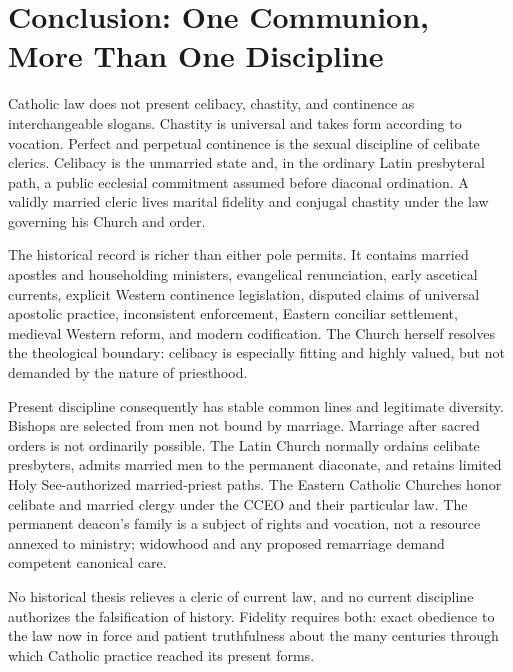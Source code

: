 \section{Conclusion: One Communion, More Than One Discipline}

Catholic law does not present celibacy, chastity, and continence as interchangeable slogans. Chastity is universal and takes form according to vocation. Perfect and perpetual continence is the sexual discipline of celibate clerics. Celibacy is the unmarried state and, in the ordinary Latin presbyteral path, a public ecclesial commitment assumed before diaconal ordination. A validly married cleric lives marital fidelity and conjugal chastity under the law governing his Church and order.

The historical record is richer than either pole permits. It contains married apostles and householding ministers, evangelical renunciation, early ascetical currents, explicit Western continence legislation, disputed claims of universal apostolic practice, inconsistent enforcement, Eastern conciliar settlement, medieval Western reform, and modern codification. The Church herself resolves the theological boundary: celibacy is especially fitting and highly valued, but not demanded by the nature of priesthood.

Present discipline consequently has stable common lines and legitimate diversity. Bishops are selected from men not bound by marriage. Marriage after sacred orders is not ordinarily possible. The Latin Church normally ordains celibate presbyters, admits married men to the permanent diaconate, and retains limited Holy See-authorized married-priest paths. The Eastern Catholic Churches honor celibate and married clergy under the CCEO and their particular law. The permanent deacon's family is a subject of rights and vocation, not a resource annexed to ministry; widowhood and any proposed remarriage demand competent canonical care.

No historical thesis relieves a cleric of current law, and no current discipline authorizes the falsification of history. Fidelity requires both: exact obedience to the law now in force and patient truthfulness about the many centuries through which Catholic practice reached its present forms.
